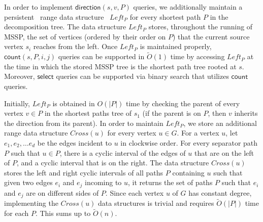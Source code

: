 \documentclass{article}
\newcommand{\direction}{\mathsf{direction}}
\newcommand{\countA}{\mathsf{count}}
\newcommand{\select}{\mathsf{select}}
\newcommand{\Otild}{\tilde{O}}
\begin{document}
In order to implement $\direction(s,v,P)$ queries, we additionally maintain a persistent~\cite{DriscollSST89} range data structure~\cite{Willard85,Chazelle88} $Left_P$  for every shortest path $P$ in the decomposition tree.
The data structure $Left_P$ stores, throughout the running of MSSP, the set of vertices (ordered by their order on $P$) that the current source vertex $s_i$ reaches from the left.
    Once $Left_P$ is maintained properly, $\countA(s,P,i,j)$ queries can be supported in $\Otild(1)$ time by accessing $Left_P$ at the time in which the stored MSSP tree is the shortest path tree rooted at $s$.
    Moreover, $\select$ queries can be supported via binary search that utilizes $\countA$ queries.

    Initially, $Left_P$ is obtained in $O(|P|)$ time by checking the parent of every vertex $v\in P$ in the shortest paths tree of $s_1$ (if the parent is on $P$, then $v$ inherits the direction from its parent).
    In order to maintain $Left_P$, we store an additional range data structure $Cross(u)$ for every vertex $u\in G$.
    For a vertex $u$, let $e_1,e_2, \ldots e_d$ be the edges incident to $u$ in clockwise order.
    For every separator path  $P$ such that $u\in P$, there is a cyclic interval of the edges of $u$ that are on the left of $P$, and a cyclic interval that is on the right.
    The data structure $Cross(u)$ stores the left and right cyclic intervals of all paths $P$ containing $u$ such that given two edges $e_i$ and $e_j$ incoming to $u$, it returns the set of paths $P$ such that $e_i$ and $e_j$ are on different sides of $P$.
    Since each vertex $u$ of $G$ has constant degree, implementing  the $Cross(u)$ data structures is trivial and requires $\Otild(|P|)$ time for each $P$.
    This sums up to $\Otild(n)$.
\end{document}
